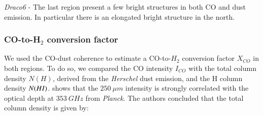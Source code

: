 \documentclass[traditabstract]{aa}
\begin{document}
\noindent \textit{Draco6} - The last region present a few bright structures in both CO and dust emission. In particular there is an elongated bright structure in the north.


\subsubsection{CO-to-H$_2$ conversion factor}
We used the CO-dust coherence to estimate a CO-to-$H_2$ conversion factor $X_{CO}$ in both regions. To do so, we compared the CO intensity $I_{CO}$ with the total column density $N(H)$, derived from the \emph{Herschel} dust emission, and the H column density $N(H\rmnum{1})$. \cite{MAMD_2017b} shows that the $250\: \mu m$ intensity is strongly correlated with the optical depth at $353\: GHz$ from \emph{Planck}. The authors concluded that the total column density is given by:
\end{document}
